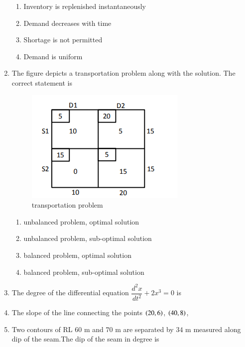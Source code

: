 \documentclass[journal,12pt,onecolumn]{IEEEtran}
\theoremstyle{remark}
\begin{document}
\begin{enumerate}
\hfill{}
\begin{multicols}{2}
\begin{enumerate}
\item Inventory is replenished instantaneously
\item Demand decreases with time
\item Shortage is not permitted
\item Demand is uniform
\end{enumerate}
\end{multicols}
\item The figure depicts a transportation problem along with the solution. The correct statement is

\hfill{}
\begin{figure}[H]
  \centering
  \includegraphics[width=0.4\columnwidth]{figs/fig.png}
  \caption{transportation problem }
  \label{fig:t}
\end{figure}
\begin{multicols}{2}
\begin{enumerate}
\item unbalanced problem, optimal solution
\item unbalanced problem, sub-optimal solution
\item balanced problem, optimal solution
\item balanced problem, sub-optimal solution
\end{enumerate}
\end{multicols}
\item The degree of the differential equation $\dfrac{d^{2}x}{dt^{2}} + 2x^{3} = 0$ is

\hfill{}
\item The slope of the line connecting the points $\left(20,6\right)$, $\left(40,8\right)$,

\hfill{}

\item  Two contours of RL $60$ m and $70$ m are separated by $34$ m measured along dip of the seam.The dip of the seam in degree is


\end{enumerate}
\end{document}

